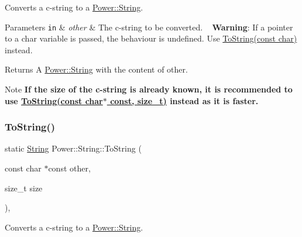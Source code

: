 Converts a c-\/string to a \hyperlink{class_power_1_1_string}{Power\+::\+String}. 


\begin{DoxyParams}[1]{Parameters}
\mbox{\tt in}  & {\em other} & The c-\/string to be converted. ~\newline
 {\bfseries Warning}\+: If a pointer to a char variable is passed, the behaviour is undefined. Use \hyperlink{class_power_1_1_string_a0567cc940b3762eb82b1575b42cdb63a}{To\+String(const char)} instead. \\
\hline
\end{DoxyParams}
\begin{DoxyReturn}{Returns}
A \hyperlink{class_power_1_1_string}{Power\+::\+String} with the content of other. 
\end{DoxyReturn}
\begin{DoxyNote}{Note}
{\bfseries If the size of the c-\/string is already known, it is recommended to use \hyperlink{class_power_1_1_string_a3d2d617ee6d215b8524253280d3d67f4}{To\+String(const char$\ast$ const, size\+\_\+t)} instead as it is faster.} 
\end{DoxyNote}
\mbox{\label{class_power_1_1_string_a3d2d617ee6d215b8524253280d3d67f4}} 
\subsubsection{\texorpdfstring{To\+String()}{ToString()}\hspace{0.1cm}{\footnotesize\ttfamily [2/11]}}
{\footnotesize\ttfamily static \hyperlink{class_power_1_1_string}{String} Power\+::\+String\+::\+To\+String (\begin{DoxyParamCaption}\item[{const char $\ast$const}]{other,  }\item[{size\+\_\+t}]{size }\end{DoxyParamCaption})\hspace{0.3cm}{\ttfamily [inline]}, {\ttfamily [static]}}



Converts a c-\/string to a \hyperlink{class_power_1_1_string}{Power\+::\+String}. 


